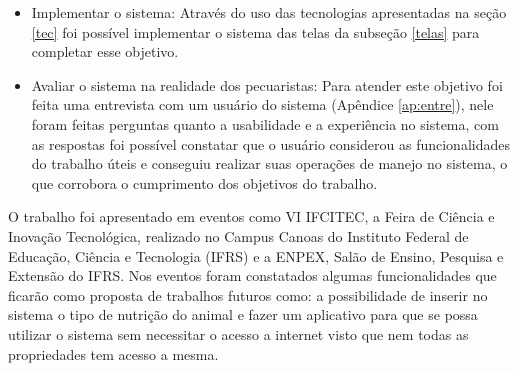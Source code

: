\begin{itemize}
	\item Implementar o sistema:
	\newline
	Através do uso das tecnologias apresentadas na seção \ref{tec} foi possível implementar o sistema das telas da subseção \ref{telas} para completar esse objetivo.

	\item Avaliar o sistema na realidade dos pecuaristas:
	\newline
	Para atender este objetivo foi feita uma entrevista com um usuário do sistema (Apêndice \ref{ap:entre}), nele foram feitas perguntas quanto a usabilidade e a experiência no sistema, com as respostas foi possível constatar que o usuário considerou as funcionalidades do trabalho úteis e conseguiu realizar suas operações de manejo no sistema, o que corrobora o cumprimento dos objetivos do trabalho.
\end{itemize}

O trabalho foi apresentado em eventos como VI IFCITEC, a Feira de Ciência e Inovação Tecnológica, realizado no Campus Canoas do Instituto Federal de Educação, Ciência e Tecnologia (IFRS) e a ENPEX, Salão de Ensino, Pesquisa e Extensão do IFRS. Nos eventos foram constatados algumas funcionalidades que ficarão como proposta de trabalhos futuros como: a possibilidade de inserir no sistema o tipo de nutrição do animal e fazer um aplicativo para que se possa utilizar o sistema sem necessitar o acesso a internet visto que nem todas as propriedades tem acesso a mesma.
